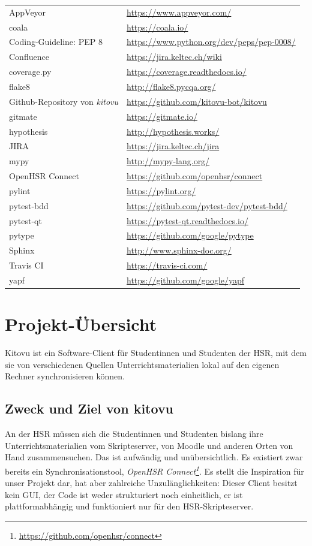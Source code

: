 \documentclass[a4paper]{article}
\let\oldsection\section
\renewcommand\section{\clearpage\oldsection}
\def\jiraurl{https://jira.keltec.ch/jira}
\def\confluenceurl{https://jira.keltec.ch/wiki}
\begin{document}
\begin{tabular}{ll}
	AppVeyor & \url{https://www.appveyor.com/} \\
	coala & \url{https://coala.io/} \\
	Coding-Guideline: PEP 8 & \url{https://www.python.org/dev/peps/pep-0008/} \\
	Confluence & \url{\confluenceurl} \\
	coverage.py & \url{https://coverage.readthedocs.io/} \\
	flake8 & \url{http://flake8.pycqa.org/} \\
	Github-Repository von \emph{kitovu} & \url{https://github.com/kitovu-bot/kitovu} \\
	gitmate & \url{https://gitmate.io/} \\
	hypothesis & \url{http://hypothesis.works/} \\
	JIRA	& \url{\jiraurl} \\
	mypy & \url{http://mypy-lang.org/} \\
	OpenHSR Connect & \url{https://github.com/openhsr/connect} \\
	pylint & \url{https://pylint.org/} \\
	pytest-bdd & \url{https://github.com/pytest-dev/pytest-bdd/} \\
	pytest-qt & \url{https://pytest-qt.readthedocs.io/} \\
	pytype & \url{https://github.com/google/pytype} \\ 
	Sphinx & \url{http://www.sphinx-doc.org/} \\
	Travis CI & \url{https://travis-ci.com/} \\
	yapf & \url{https://github.com/google/yapf} \\
	
\end{tabular}

\section{Projekt-Übersicht}
Kitovu ist ein Software-Client für Studentinnen und Studenten der HSR, mit dem sie von verschiedenen Quellen Unterrichtsmaterialien lokal auf den eigenen Rechner synchronisieren können.

\subsection{Zweck und Ziel von kitovu}
An der HSR müssen sich die Studentinnen und Studenten bislang ihre Unterrichtsmaterialien vom Skripteserver, von Moodle und anderen Orten von Hand zusammensuchen. Das ist aufwändig und unübersichtlich. Es existiert zwar bereits ein Synchronisationstool, \emph{OpenHSR Connect\footnote{\url{https://github.com/openhsr/connect}}}. Es stellt die Inspiration für unser Projekt dar, hat aber zahlreiche Unzulänglichkeiten: Dieser Client besitzt kein GUI, der Code ist weder strukturiert noch einheitlich, er ist plattformabhängig und funktioniert nur für den HSR-Skripteserver.
\end{document}

